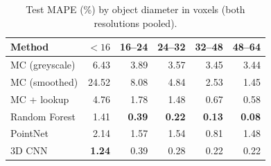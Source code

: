\begin{table}[t]
  \centering\footnotesize
  \caption{Test MAPE (\%) by object diameter in voxels (both resolutions pooled).}
  \label{tab:diameter}
  \setlength{\tabcolsep}{3.5pt}
  \begin{tabular}{lrrrrr}
    \toprule
    Method & $<16$ & 16--24 & 24--32 & 32--48 & 48--64 \\
    \midrule
    MC (greyscale) & 6.43 & 3.89 & 3.57 & 3.45 & 3.44 \\
    MC (smoothed) & 24.52 & 8.08 & 4.84 & 2.53 & 1.45 \\
    \midrule
    MC + lookup & 4.76 & 1.78 & 1.48 & 0.67 & 0.58 \\
    Random Forest & 1.41 & \textbf{0.39} & \textbf{0.22} & \textbf{0.13} & \textbf{0.08} \\
    PointNet & 2.14 & 1.57 & 1.54 & 0.81 & 1.48 \\
    3D CNN & \textbf{1.24} & 0.39 & 0.28 & 0.22 & 0.22 \\
    \bottomrule
  \end{tabular}
\end{table}
